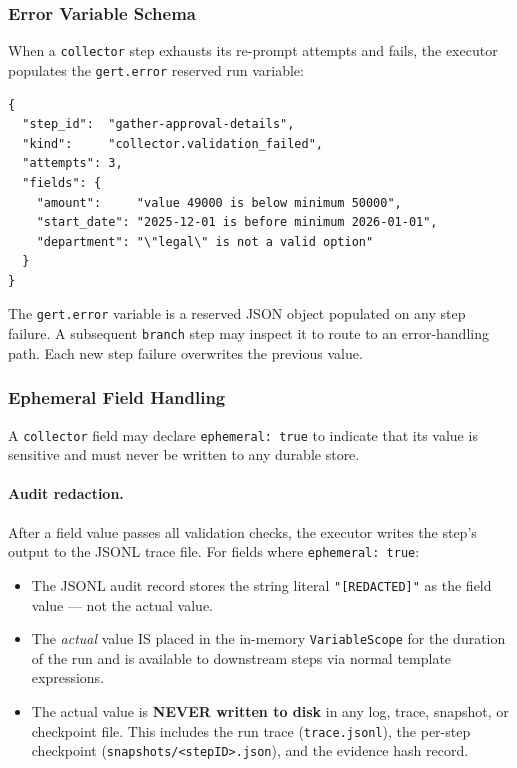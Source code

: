 \subsubsection*{Error Variable Schema}

When a \texttt{collector} step exhausts its re-prompt attempts and fails, the executor
populates the \texttt{gert.error} reserved run variable:

\begin{verbatim}
{
  "step_id":  "gather-approval-details",
  "kind":     "collector.validation_failed",
  "attempts": 3,
  "fields": {
    "amount":     "value 49000 is below minimum 50000",
    "start_date": "2025-12-01 is before minimum 2026-01-01",
    "department": "\"legal\" is not a valid option"
  }
}
\end{verbatim}

The \texttt{gert.error} variable is a reserved JSON object populated on any step
failure. A subsequent \texttt{branch} step may inspect it to route to an error-handling
path. Each new step failure overwrites the previous value.

\subsubsection*{Ephemeral Field Handling}
\label{sec:ephemeral-field-handling}

A \texttt{collector} field may declare \texttt{ephemeral: true} to indicate that its
value is sensitive and must never be written to any durable store.

\paragraph{Audit redaction.}
After a field value passes all validation checks, the executor writes the step's output
to the JSONL trace file.  For fields where \texttt{ephemeral: true}:

\begin{itemize}
  \item The JSONL audit record stores the string literal \texttt{"[REDACTED]"} as the
        field value — not the actual value.
  \item The \emph{actual} value IS placed in the in-memory \texttt{VariableScope} for
        the duration of the run and is available to downstream steps via normal template
        expressions.
  \item The actual value is \textbf{NEVER written to disk} in any log, trace, snapshot,
        or checkpoint file.  This includes the run trace (\texttt{trace.jsonl}), the
        per-step checkpoint (\texttt{snapshots/<stepID>.json}), and the evidence hash
        record.
\end{itemize}


